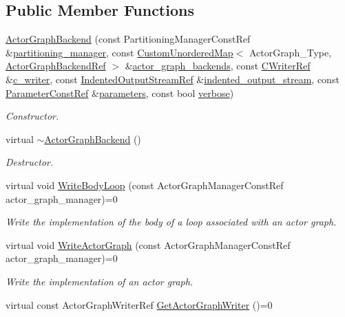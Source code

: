 \subsection*{Public Member Functions}
\begin{DoxyCompactItemize}
\item 
\hyperlink{classActorGraphBackend_ac32f8b645a1dec8e32d4911c02d17320}{Actor\+Graph\+Backend} (const Partitioning\+Manager\+Const\+Ref \&\hyperlink{classActorGraphBackend_ace4589f3c341c6da0f34311d05a56d9d}{partitioning\+\_\+manager}, const \hyperlink{custom__map_8hpp_ad1ed68f2ff093683ab1a33522b144adc}{Custom\+Unordered\+Map}$<$ Actor\+Graph\+\_\+\+Type, \hyperlink{actor__graph__backend_8hpp_ae30db41c92b2664ac3ed9f9633c49969}{Actor\+Graph\+Backend\+Ref} $>$ \&\hyperlink{classActorGraphBackend_a8b2c70ac1d05962bd8ef3938ff0b5245}{actor\+\_\+graph\+\_\+backends}, const \hyperlink{c__writer_8hpp_a4e9c4dfe17e35f981e27b6dd97f9632c}{C\+Writer\+Ref} \&\hyperlink{classActorGraphBackend_a2cb0997768049a912eda90135e53b6d1}{c\+\_\+writer}, const \hyperlink{indented__output__stream_8hpp_ab32278e11151ef292759c88e99b77feb}{Indented\+Output\+Stream\+Ref} \&\hyperlink{classActorGraphBackend_a7cb3b39da131fa83f3968c607e6c759b}{indented\+\_\+output\+\_\+stream}, const \hyperlink{Parameter_8hpp_a37841774a6fcb479b597fdf8955eb4ea}{Parameter\+Const\+Ref} \&\hyperlink{classActorGraphBackend_a232a0dcb6c538474c938a8dffbcf301e}{parameters}, const bool \hyperlink{classActorGraphBackend_afd77c9f5660886e118b6af2b4be03328}{verbose})
\begin{DoxyCompactList}\small\item\em Constructor. \end{DoxyCompactList}\item 
virtual \hyperlink{classActorGraphBackend_a135a6332855ab9bd0167d62df1d584a3}{$\sim$\+Actor\+Graph\+Backend} ()
\begin{DoxyCompactList}\small\item\em Destructor. \end{DoxyCompactList}\item 
virtual void \hyperlink{classActorGraphBackend_af0f218afe9f031f313adfe35c1faa08e}{Write\+Body\+Loop} (const Actor\+Graph\+Manager\+Const\+Ref actor\+\_\+graph\+\_\+manager)=0
\begin{DoxyCompactList}\small\item\em Write the implementation of the body of a loop associated with an actor graph. \end{DoxyCompactList}\item 
virtual void \hyperlink{classActorGraphBackend_a600bc1bcaf20114fc1c671d7f1f08e1b}{Write\+Actor\+Graph} (const Actor\+Graph\+Manager\+Const\+Ref actor\+\_\+graph\+\_\+manager)=0
\begin{DoxyCompactList}\small\item\em Write the implementation of an actor graph. \end{DoxyCompactList}\item 
virtual const Actor\+Graph\+Writer\+Ref \hyperlink{classActorGraphBackend_a33020a6f87233b51a860d21be668d9b4}{Get\+Actor\+Graph\+Writer} ()=0
\end{DoxyCompactItemize}
